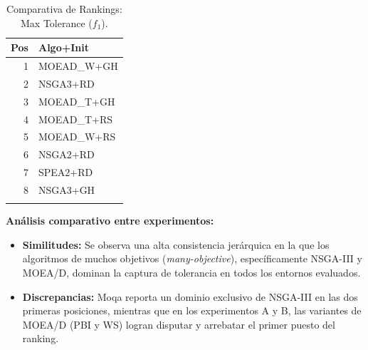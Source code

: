 \documentclass[a4paper,10pt]{article}
\begin{document}
\begin{table}[H]
\begin{minipage}[t]{0.32\textwidth}
        \begin{tabular}{rl}
            \toprule
            Pos & Algo+Init \\ \midrule
            1 & MOEAD\_W+GH \\
            2 & NSGA3+RD \\
            3 & MOEAD\_T+GH \\
            4 & MOEAD\_T+RS \\
            5 & MOEAD\_W+RS \\
            6 & NSGA2+RD \\
            7 & SPEA2+RD \\
            8 & NSGA3+GH \\
            \\
            \bottomrule
        \end{tabular}
    \end{minipage}
    \caption{Comparativa de Rankings: Max Tolerance ($f_1$).}
\end{table}

\textbf{Análisis comparativo entre experimentos:}
\begin{itemize}
    \item \textbf{Similitudes:} Se observa una alta consistencia jerárquica en la que los algoritmos de muchos objetivos (\textit{many-objective}), específicamente NSGA-III y MOEA/D, dominan la captura de tolerancia en todos los entornos evaluados.
    \item \textbf{Discrepancias:} Moqa reporta un dominio exclusivo de NSGA-III en las dos primeras posiciones, mientras que en los experimentos A y B, las variantes de MOEA/D (PBI y WS) logran disputar y arrebatar el primer puesto del ranking.
\end{itemize}
\end{document}
